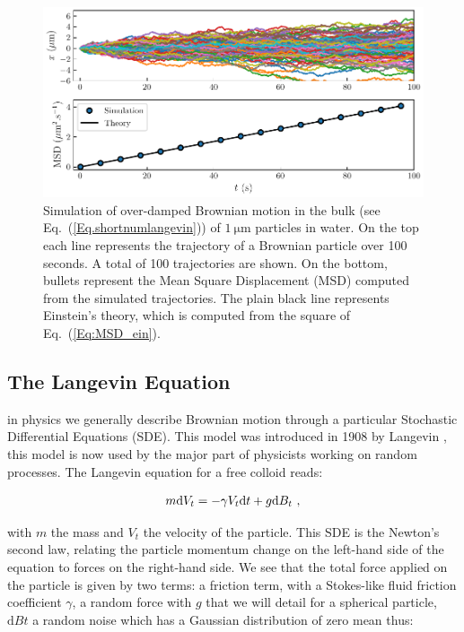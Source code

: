 \begin{figure}[!h]
	\centering
	\includegraphics{02_body/chapter1/image/brown_exemple.pdf}
	\caption{Simulation of over-damped Brownian motion in the bulk (see Eq.~(\ref{Eq.shortnumlangevin})) of $1 ~ \mathrm{\mu m}$ particles in water. On the top each line represents the trajectory of a Brownian particle over 100 seconds. A total of 100 trajectories are shown. On the bottom, bullets represent the Mean Square Displacement (\gls{MSD}) computed from the simulated trajectories. The plain black line represents Einstein's theory, which is computed from the square of Eq.~(\ref{Eq:MSD_ein}).\href{https://github.com/eXpensia/Confined-Brownian-Motion/blob/main/02_body/chapter1/image/simple_Brownian.ipynb}{\faGithub}}
	\label{fig:bulkbrown}
\end{figure}

\subsection{The Langevin Equation}

in physics we generally describe Brownian motion through a particular Stochastic Differential Equations (\gls{SDE}). This model was introduced in 1908 by Langevin \cite{langevin_sur_1908}, this model is now used by the major part of physicists working on random processes. The Langevin equation for a free colloid reads:

\begin{equation}
	m \textnormal{d}V_t  = - \gamma V_t \textnormal{d}t + g \textnormal{d}B_t ~,
	\label{Eq.langevinEquation}
\end{equation}


with $m$ the mass and $V_t$ the velocity of the particle. This \gls{SDE} is the Newton's second law, relating the particle momentum change on the left-hand side of the equation to forces on the right-hand side. We see that the total force applied on the particle is given by two terms: a friction term, with a Stokes-like fluid friction coefficient $\gamma$, a random force with $g$ that we will detail for a spherical particle, $\mathrm{d}Bt$ a random noise which has a Gaussian distribution of zero mean thus:

